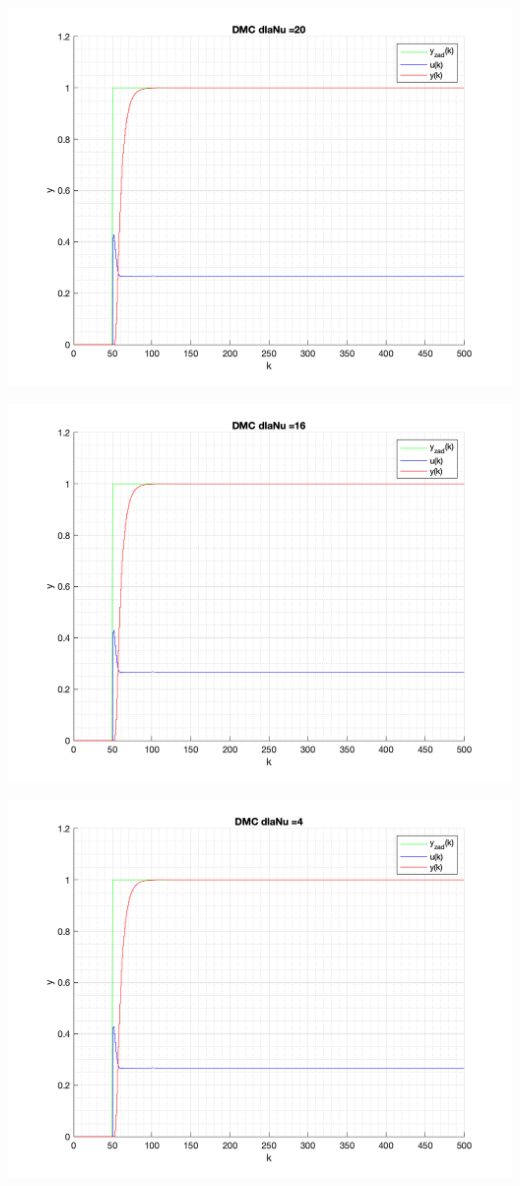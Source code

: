 \documentclass[a4paper, 11pt]{article}
\begin{document}
\begin{enumerate}
 \includegraphics[width=\linewidth]{./ModelsP4_Nu/P4_DMC_Nu_20_png.png} 
 
 \includegraphics[width=\linewidth]{./ModelsP4_Nu/P4_DMC_Nu_16_png.png} 
 
 \includegraphics[width=\linewidth]{./ModelsP4_Nu/P4_DMC_Nu_4_png.png} 
 

\end{enumerate}
\end{document}
